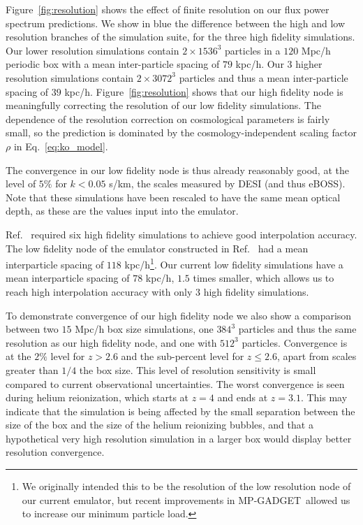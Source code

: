 \documentclass[a4paper,11pt]{article}
\newcommand{\mpgadget}{{\small MP-GADGET}}
\begin{document}
Figure~\ref{fig:resolution} shows the effect of finite resolution on our flux power spectrum predictions. We show in blue the difference between the high and low resolution branches of the simulation suite, for the three high fidelity simulations. Our lower resolution simulations contain $2\times 1536^3$ particles in a $120$ Mpc/h periodic box with a mean inter-particle spacing of $79$ kpc/h. Our $3$ higher resolution simulations contain $2\times 3072^3$ particles and thus a mean inter-particle spacing of $39$ kpc/h. Figure~\ref{fig:resolution} shows that our high fidelity node is meaningfully correcting the resolution of our low fidelity simulations. The dependence of the resolution correction on cosmological parameters is fairly small, so the prediction is dominated by the cosmology-independent scaling factor $\rho$ in Eq.~\ref{eq:ko_model}.

The convergence in our low fidelity node is thus already reasonably good, at the level of $5\%$ for $k < 0.05$ s/km, the scales measured by DESI (and thus eBOSS). Note that these simulations have been rescaled to have the same mean optical depth, as these are the values input into the emulator.

Ref.~\cite{Fernandez:2022} required six high fidelity simulations to achieve good interpolation accuracy. The low fidelity node of the emulator constructed in Ref.~\cite{Fernandez:2022} had a mean interparticle spacing of $118$ kpc/h\footnote{We originally intended this to be the resolution of the low resolution node of our current emulator, but recent improvements in \mpgadget~allowed us to increase our minimum particle load.}. Our current low fidelity simulations have a mean interparticle spacing of $78$ kpc/h, $1.5$ times smaller, which allows us to reach high interpolation accuracy with only $3$ high fidelity simulations.

To demonstrate convergence of our high fidelity node we also show a comparison between two $15$ Mpc/h box size simulations, one $384^3$ particles and thus the same resolution as our high fidelity node, and one with $512^3$ particles. Convergence is at the $2\%$ level for $z > 2.6$ and the sub-percent level for $z \leq 2.6$, apart from scales greater than $1/4$ the box size. This level of resolution sensitivity is small compared to current observational uncertainties.
The worst convergence is seen during helium reionization, which starts at $z=4$ and ends at $z=3.1$. This may indicate that the simulation is being affected by the small separation between the size of the box and the size of the helium reionizing bubbles, and that a hypothetical very high resolution simulation in a larger box would display better resolution convergence.
\end{document}
